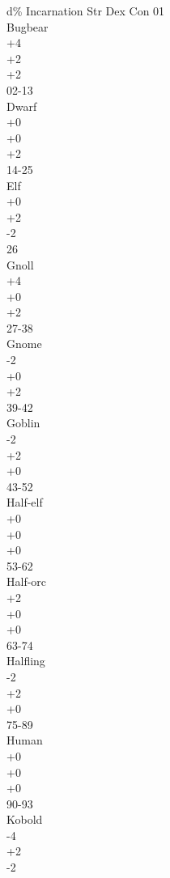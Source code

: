 {{
d\%
Incarnation
Str
Dex
Con
	01\\
	Bugbear\\
	+4\\
	+2\\
	+2\\
	02-13\\
	Dwarf\\
	+0\\
	+0\\
	+2\\
	14-25\\
	Elf\\
	+0\\
	+2\\
	-2\\
	26\\
	Gnoll\\
	+4\\
	+0\\
	+2\\
	27-38\\
	Gnome\\
	-2\\
	+0\\
	+2\\
	39-42\\
	Goblin\\
	-2\\
	+2\\
	+0\\
	43-52\\
	Half-elf\\
	+0\\
	+0\\
	+0\\
	53-62\\
	Half-orc\\
	+2\\
	+0\\
	+0\\
	63-74\\
	Halfling\\
	-2\\
	+2\\
	+0\\
	75-89\\
	Human\\
	+0\\
	+0\\
	+0\\
	90-93\\
	Kobold\\
	-4\\
	+2\\
	-2\\
}}
